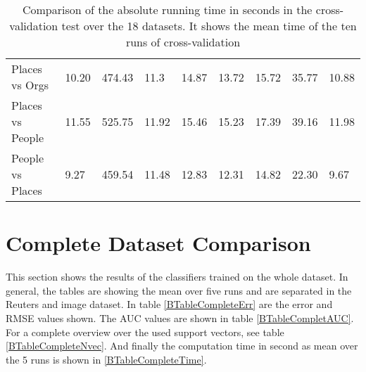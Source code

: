 \begin{table}[]
{\begin{tabular}{@{}lllllllll@{}}
			Places vs Orgs        & 10.20 & 474.43 & 11.3 & 14.87         & 13.72 & 15.72 & 35.77 & 10.88 \\
			Places vs People      & 11.55 & 525.75 & 11.92 & 15.46         & 15.23 & 17.39 & 39.16 & 11.98 \\
			People vs Places      & 9.27  & 459.54 & 11.48 & 12.83         & 12.31 & 14.82 & 22.30 & 9.67  \\ \bottomrule
	\end{tabular}}
	\caption[Time comparison from cross-validation]{Comparison of the absolute running time in seconds in the cross-validation test over the 18 datasets. It shows the mean time of the ten runs of cross-validation\label{BTableFTTime}}
\end{table}
\section{Complete Dataset Comparison}\label{BSecCom}
This section shows the results of the classifiers trained on the whole dataset. 
In general, the tables are showing the mean over five runs and are separated in the Reuters and image dataset.
In table \ref{BTableCompleteErr} are the error and \acs{RMSE} values shown.
The \acs{AUC} values are shown in table \ref{BTableCompletAUC}.
For a complete overview over the used support vectors, see table \ref{BTableCompleteNvec}.
And finally the computation time in second as mean over the 5 runs is shown in \ref{BTableCompleteTime}. 
